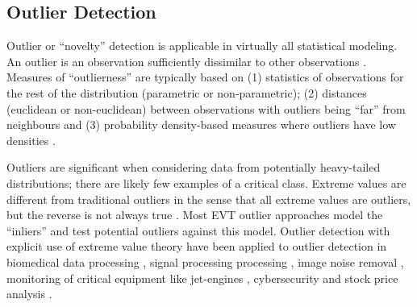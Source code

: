 
\FloatBarrier
\subsection{Outlier Detection}
\label{subsec:01outlier}

Outlier or ``novelty'' detection is applicable in virtually all statistical modeling. An outlier is an observation sufficiently dissimilar to other observations \citep{barnett1984outliers}. Measures of ``outlierness'' are typically based on (1) statistics of observations for the rest of the distribution (parametric or non-parametric); (2) distances (euclidean or non-euclidean) between observations with outliers being ``far'' from neighbours and (3) probability density-based measures where outliers have low densities \citep{hodge2004survey}.

Outliers are significant when considering data from potentially heavy-tailed distributions; there are likely few examples of a critical class. Extreme values are different from traditional outliers in the sense that all extreme values are outliers, but the reverse is not always true \citep{aggarwal2015outlier}. Most EVT outlier approaches model the ``inliers'' and test potential outliers against this model. Outlier detection with explicit use of extreme value theory have been applied to outlier detection in biomedical data processing \citep{roberts2000extreme}, signal processing processing \citep{hazan2012extreme}, image noise removal \citep{roberts1999novelty}, monitoring of critical equipment like jet-engines \citep{clifton2009comparison}, cybersecurity and stock price analysis \citep{siffer2017anomaly}.

